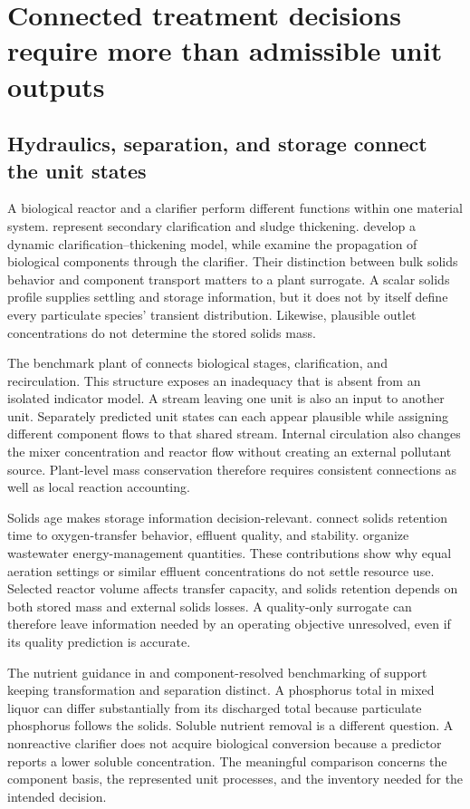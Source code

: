 \section{Connected treatment decisions require more than admissible unit outputs}

\subsection{Hydraulics, separation, and storage connect the unit states}

A biological reactor and a clarifier perform different functions within one material system. \citet{HartelPopel1992} represent secondary clarification and sludge thickening. \citet{Takacs1991} develop a dynamic clarification--thickening model, while \citet{JeppssonDiehl1996} examine the propagation of biological components through the clarifier. Their distinction between bulk solids behavior and component transport matters to a plant surrogate. A scalar solids profile supplies settling and storage information, but it does not by itself define every particulate species' transient distribution. Likewise, plausible outlet concentrations do not determine the stored solids mass.

The benchmark plant of \citet{Alex2008} connects biological stages, clarification, and recirculation. This structure exposes an inadequacy that is absent from an isolated indicator model. A stream leaving one unit is also an input to another unit. Separately predicted unit states can each appear plausible while assigning different component flows to that shared stream. Internal circulation also changes the mixer concentration and reactor flow without creating an external pollutant source. Plant-level mass conservation therefore requires consistent connections as well as local reaction accounting.

Solids age makes storage information decision-relevant. \citet{Leu2012} connect solids retention time to oxygen-transfer behavior, effluent quality, and stability. \citet{Miederer2025} organize wastewater energy-management quantities. These contributions show why equal aeration settings or similar effluent concentrations do not settle resource use. Selected reactor volume affects transfer capacity, and solids retention depends on both stored mass and external solids losses. A quality-only surrogate can therefore leave information needed by an operating objective unresolved, even if its quality prediction is accurate.

The nutrient guidance in \citet{USEPA2009} and component-resolved benchmarking of \citet{Zhang2026} support keeping transformation and separation distinct. A phosphorus total in mixed liquor can differ substantially from its discharged total because particulate phosphorus follows the solids. Soluble nutrient removal is a different question. A nonreactive clarifier does not acquire biological conversion because a predictor reports a lower soluble concentration. The meaningful comparison concerns the component basis, the represented unit processes, and the inventory needed for the intended decision.

